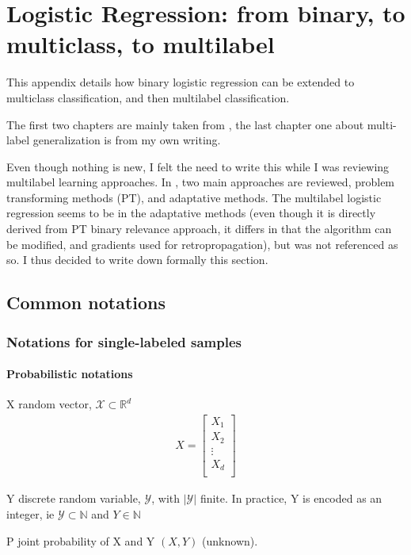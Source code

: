 \chapter{Logistic Regression: from binary, to multiclass, to multilabel} 

This appendix details how binary logistic regression can be extended to multiclass classification, and then multilabel classification.

The first two chapters are mainly taken from \cite{stanfordLogistic}, the last chapter one about multi-label generalization is from my own writing.

Even though nothing is new, I felt the need to write this while I was reviewing multilabel learning approaches. In \cite{MultilabelReview}, two main approaches are reviewed, problem transforming methods (PT), and adaptative methods. The multilabel logistic regression seems to be in the adaptative methods (even though it is directly derived from PT binary relevance approach, it differs in that the algorithm can be modified, and gradients used for retropropagation), but was not referenced as so. I thus decided to write down formally this section.

\section*{Common notations}


\subsection*{Notations for single-labeled samples}

\subsubsection*{Probabilistic notations}

\begin{outline}
\1 X random vector, $\mathcal{X} \subset \mathbb{R}^d$
\begin{align}
	X = \left[
	\begin{array}{cccc}
		X_{1} \\
		X_{2} \\
		\vdots\\
		X_{d} \\
	\end{array}\right]
\end{align}

\1 Y discrete random variable, $\mathcal{Y} $, with $|\mathcal{Y}|$ finite. In practice, Y is encoded as an integer, ie $\mathcal{Y} \subset \mathbb{N} $ and $Y \in \mathbb{N}$

\1 P joint probability of X and Y $(X,Y)$ (unknown).
\end{outline}

